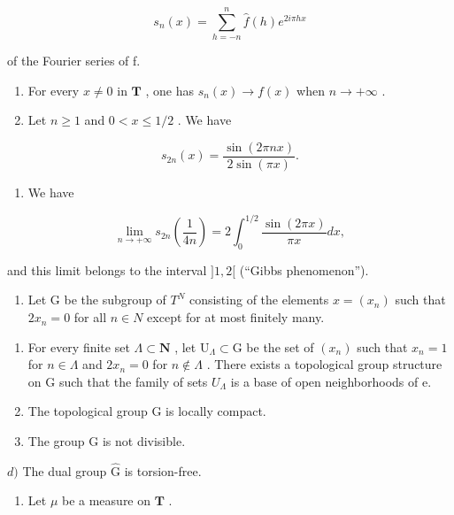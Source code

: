 \[
s _ {n} (x) = \sum_ {h = - n} ^ {n} \widehat {f} (h) e ^ {2 i \pi h x}
\]

of the Fourier series of f.

\begin{enumerate}
\def\labelenumi{\alph{enumi})}
\item
  For every \(x \neq 0\) in \(\mathbf{T}\) , one has \(s_n(x) \to f(x)\) when \(n \to +\infty\) .
\item
  Let \(n \geqslant 1\) and \(0 < x \leqslant 1/2\) . We have
\end{enumerate}

\[
s _ {2 n} (x) = \frac {\sin (2 \pi n x)}{2 \sin (\pi x)}.
\]

\begin{enumerate}
\def\labelenumi{\alph{enumi})}
\setcounter{enumi}{2}
\tightlist
\item
  We have
\end{enumerate}

\[
\lim _ {n \rightarrow + \infty} s _ {2 n} \left(\frac {1}{4 n}\right) = 2 \int_ {0} ^ {1 / 2} \frac {\sin (2 \pi x)}{\pi x} d x,
\]

and this limit belongs to the interval \(]1,2[\) (“Gibbs phenomenon”).

\begin{enumerate}
\def\labelenumi{\arabic{enumi})}
\setcounter{enumi}{62}
\tightlist
\item
  Let G be the subgroup of \(T^{N}\) consisting of the elements \(x = (x_{n})\) such that \(2x_{n} = 0\) for all \(n \in N\) except for at most finitely many.
\end{enumerate}

\begin{enumerate}
\def\labelenumi{\alph{enumi})}
\item
  For every finite set \(\Lambda \subset \mathbf{N}\) , let \(\mathrm{U}_{\Lambda} \subset \mathrm{G}\) be the set of \((x_{n})\) such that \(x_{n} = 1\) for \(n \in \Lambda\) and \(2x_{n} = 0\) for \(n \notin \Lambda\) . There exists a topological group structure on G such that the family of sets \(U_{\Lambda}\) is a base of open neighborhoods of e.
\item
  The topological group G is locally compact.
\item
  The group G is not divisible.
\end{enumerate}

\(d)\) The dual group \(\widehat{\mathrm{G}}\) is torsion-free.

\begin{enumerate}
\def\labelenumi{\arabic{enumi})}
\setcounter{enumi}{63}
\tightlist
\item
  Let \(\mu\) be a measure on \(\mathbf{T}\) .
\end{enumerate}

